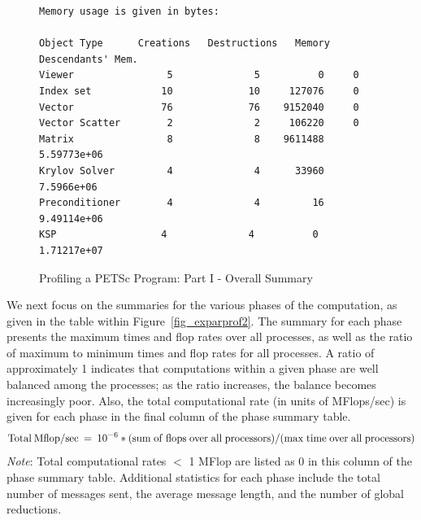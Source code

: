 \begin{figure}[tb]
{\begin{verbatim}
Memory usage is given in bytes:

Object Type      Creations   Destructions   Memory  Descendants' Mem.
Viewer                5              5          0     0
Index set            10             10     127076     0
Vector               76             76    9152040     0
Vector Scatter        2              2     106220     0
Matrix                8              8    9611488     5.59773e+06
Krylov Solver         4              4      33960     7.5966e+06
Preconditioner        4              4         16     9.49114e+06
KSP                  4              4          0     1.71217e+07
\end{verbatim}
}
\caption{Profiling a PETSc Program: Part I - Overall Summary}
\label{fig_exparprof}
\end{figure}

We next focus on the summaries for the various phases of the
computation, as given in the table within Figure~\ref{fig_exparprof2}.  The summary for
each phase presents the maximum times and flop rates over all
processes, as well as the ratio of maximum to minimum times and flop
rates for all processes.  A ratio of approximately 1 indicates that
computations within a given phase are well balanced among the
processes; as the ratio increases, the balance becomes increasingly
poor.  Also, the total computational rate (in units of MFlops/sec) is
given for each phase in the final column of the phase summary table.
\[
   {\rm Total\: Mflop/sec} \:=\: 10^{-6} * ({\rm sum\; of\; flops\; over\; all\; processors})/({\rm max\; time\; over\; all\; processors})
\]
{\em Note}: Total computational rates $<$ 1 MFlop are listed as 0 in this column
of the phase summary table.
Additional statistics for each phase include the total number of messages sent,
the average message length, and the number of global reductions.

